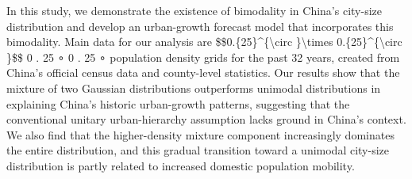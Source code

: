 In this study, we demonstrate the existence of bimodality in China's city-size distribution and develop an urban-growth forecast model that incorporates this bimodality. Main data for our analysis are                                                                           {\$}{\$}0.{\{}25{\}}^{\{}{\backslash}circ {\}}{\backslash}times 0.{\{}25{\}}^{\{}{\backslash}circ {\}}{\$}{\$}                                                                                    0                        .                                                                              25                                                    ∘                                                {\texttimes}                        0                        .                                                                              25                                                    ∘                                                                                                     population density grids for the past 32 years, created from China's official census data and county-level statistics. Our results show that the mixture of two Gaussian distributions outperforms unimodal distributions in explaining China's historic urban-growth patterns, suggesting that the conventional unitary urban-hierarchy assumption lacks ground in China's context. We also find that the higher-density mixture component increasingly dominates the entire distribution, and this gradual transition toward a unimodal city-size distribution is partly related to increased domestic population mobility.